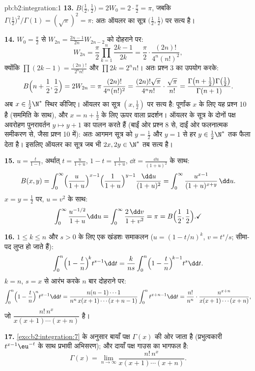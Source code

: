 \begin{solution}{pb:b2:integration:1}
\textbf{13.} $B\bigl(\frac12,\frac12\bigr) = 2W_0 =
2\cdot\frac\pi2 = \pi$, जबकि $\Gamma\bigl(\frac12\bigr)^2/\Gamma(1) = (\sqrt\pi)^2 = \pi$: अतः ऑयलर का सूत्र $\bigl(\frac12,\frac12\bigr)$ पर सत्य है।

\textbf{14.} $W_0 = \frac\pi2$ से $W_{2n} = \frac{2n-1}{2n}W_{2n-2}$ को दोहराने पर:
\[
W_{2n} = \frac\pi2\prod_{k=1}^{n}\frac{2k-1}{2k}
= \frac\pi2\cdot\frac{(2n)!}{4^n(n!)^2},
\]
क्योंकि $\prod(2k-1) = \frac{(2n)!}{2^n n!}$ और $\prod 2k = 2^n
n!$। अतः प्रश्न 3 का उपयोग करके:
\[
B\Bigl(n+\frac12, \frac12\Bigr) = 2W_{2n}
= \pi\,\frac{(2n)!}{4^n(n!)^2}
= \frac{(2n)!\sqrt\pi}{4^n n!}\cdot\frac{\sqrt\pi}{n!}
= \frac{\Gamma\bigl(n+\frac12\bigr)\Gamma\bigl(\frac12\bigr)}
{\Gamma(n+1)} .
\]
अब $x \in \frac12\N^*$ स्थिर कीजिए। ऑयलर का सूत्र $(x,
\frac12)$ पर सत्य है: पूर्णांक $x$ के लिए यह
प्रश्न 10 है (सममिति के साथ), और $x = n + \frac12$ के लिए ऊपर वाला प्रदर्शन। ऑयलर के
सूत्र के दोनों पक्ष अवरोहण पुनरावर्तन $y \mapsto y + 1$ का पालन करते हैं (बाईं ओर
प्रश्न 8 से, दाईं ओर फलनात्मक समीकरण से, जैसा प्रश्न 10 में): अतः आगमन
सूत्र को $y =
\frac12$ और $y = 1$ से हर $y \in \frac12\N^*$ तक फैला देता है। इसलिए ऑयलर का सूत्र जब
भी $2x, 2y \in \N^*$ तब सत्य है।

\textbf{15.} $u = \frac{t}{1-t}$, अर्थात् $t =
\frac{u}{1+u}$, $1 - t = \frac{1}{1+u}$, $\dd t =
\frac{\dd u}{(1+u)^2}$ के साथ:
\[
B(x,y) = \int_0^\infty
\Bigl(\frac{u}{1+u}\Bigr)^{x-1}
\Bigl(\frac{1}{1+u}\Bigr)^{y-1}
\frac{\dd u}{(1+u)^2}
= \int_0^\infty \frac{u^{x-1}}{(1+u)^{x+y}}\,\dd u .
\]
$x = y = \frac12$ पर, $u = v^2$ के साथ:
\[
\int_0^\infty \frac{u^{-1/2}}{1+u}\dd u
= \int_0^\infty \frac{2\,\dd v}{1+v^2} = \pi
= B\Bigl(\frac12,\frac12\Bigr) . \checkmark
\]

\textbf{16.} $1 \leq k \leq n$ और $s > 0$ के लिए एक खंडशः समाकलन ($u = (1 - t/n)^k$, $v = t^s/s$; सीमा-पद लुप्त
हो जाते हैं):
\[
\int_0^n \Bigl(1-\frac tn\Bigr)^{\!k} t^{s-1}\dd t
= \frac{k}{ns}\int_0^n \Bigl(1-\frac tn\Bigr)^{\!k-1}
t^{s}\dd t .
\]
$k = n$, $s = x$ से आरंभ करके $n$ बार दोहराने पर:
\[
\int_0^n \Bigl(1-\frac tn\Bigr)^{\!n} t^{x-1}\dd t
= \frac{n(n-1)\cdots1}{n^n\,x(x+1)\cdots(x+n-1)}
\int_0^n t^{x+n-1}\dd t
= \frac{n!}{n^n}\cdot
\frac{n^{x+n}}{x(x+1)\cdots(x+n)} ,
\]
जो $\dfrac{n!\,n^x}{x(x+1)\cdots(x+n)}$ है।

\textbf{17.} \cref{exo:b2:integration:7} के अनुसार बायाँ पक्ष $\Gamma(x)$ की ओर जाता है (प्रभुत्वकारी
$t^{x-1}\eu^{-t}$ के साथ प्रभावी अभिसरण); और दायाँ पक्ष गाउस का भागफल है:
\[
\Gamma(x) = \lim_{n\to\infty}
\frac{n!\,n^x}{x(x+1)\cdots(x+n)} .
\]


\end{solution}
